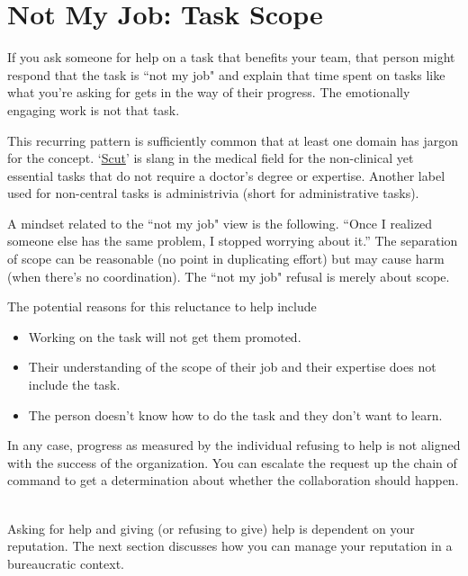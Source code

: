 \section{Not My Job: Task Scope}


If you ask someone for help on a task that benefits your team, that person might respond that the task is ``not my job" and explain that time spent on tasks like what you're asking for gets in the way of their progress. The emotionally engaging work is not that task.

This recurring pattern is sufficiently common that at least one domain has jargon for the concept.
`\href{https://www.urbandictionary.com/define.php?term=scut}{Scut}'\iftoggle{WPinmargin}{\marginpar{[Urbandictionary.com] scut}}{}
is  slang in the medical field for the non-clinical yet essential tasks that do not require a doctor's degree or expertise.
Another label used for non-central tasks is administrivia (short for administrative tasks).

A mindset related to the ``not my job" view is the following.
``Once I realized someone else has the same problem, I stopped worrying about it.'' The separation of scope can be reasonable (no point in duplicating effort) but may cause harm (when there's no coordination). The ``not my job" refusal is merely about scope. 

The potential reasons for this reluctance to help include
\begin{itemize}
    \item Working on the task will not get them promoted.
    \item Their understanding of the scope of their job and their expertise does not include the task.
    \item The person doesn't know how to do the task and they don't want to learn.
\end{itemize}
In any case, progress as measured by the individual refusing to help is not aligned with the success of the organization. You can escalate the request up the chain of command to get a determination about whether the collaboration should happen.

\ \\


Asking for help and giving (or refusing to give) help is dependent on your reputation.
The next section discusses how you can manage your reputation in a bureaucratic context.